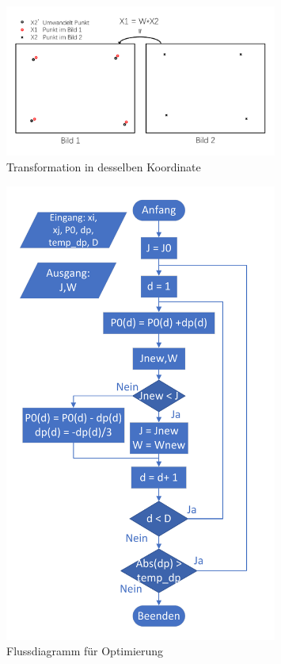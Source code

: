 \begin{figure}[H]
 \centering 
 \includegraphics[keepaspectratio,width=0.8\textwidth]{images/3_Ersteverfahren/Kamera/Transformmatrix.pdf}
 \caption{Transformation in desselben Koordinate}
 \label{fig:Transformation in eine Koordinate}
\end{figure} 

\begin{figure}[H]
 \centering 
 \includegraphics[keepaspectratio,width=0.8\textwidth]{images/3_Ersteverfahren/Kamera/flussdiagramm_for_parameter.pdf}
 \caption{Flussdiagramm für Optimierung}
 \label{fig:FlussdiagrammforOptimierung}
\end{figure} 



